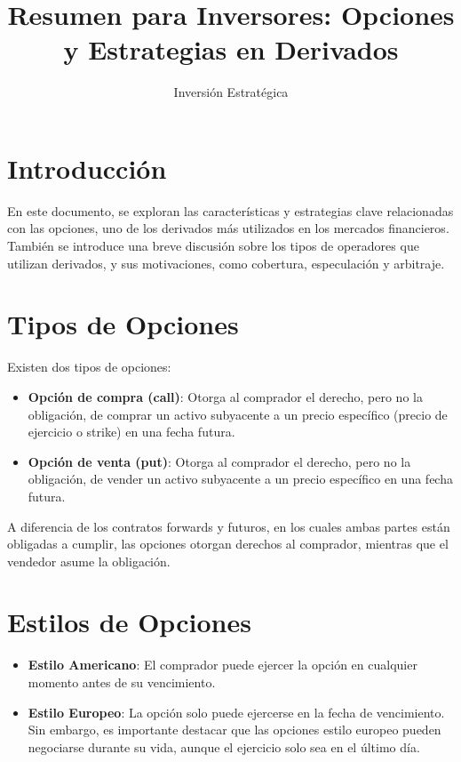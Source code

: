 \documentclass{article}
\title{Resumen para Inversores: Opciones y Estrategias en Derivados}
\author{Inversión Estratégica}
\begin{document}
\maketitle

\section*{Introducción}

En este documento, se exploran las características y estrategias clave relacionadas con las opciones, uno de los derivados más utilizados en los mercados financieros. También se introduce una breve discusión sobre los tipos de operadores que utilizan derivados, y sus motivaciones, como cobertura, especulación y arbitraje.

\section*{Tipos de Opciones}

Existen dos tipos de opciones:
\begin{itemize}
    \item \textbf{Opción de compra (call)}: Otorga al comprador el derecho, pero no la obligación, de comprar un activo subyacente a un precio específico (precio de ejercicio o strike) en una fecha futura.
    \item \textbf{Opción de venta (put)}: Otorga al comprador el derecho, pero no la obligación, de vender un activo subyacente a un precio específico en una fecha futura.
\end{itemize}

A diferencia de los contratos forwards y futuros, en los cuales ambas partes están obligadas a cumplir, las opciones otorgan derechos al comprador, mientras que el vendedor asume la obligación.

\section*{Estilos de Opciones}

\begin{itemize}
    \item \textbf{Estilo Americano}: El comprador puede ejercer la opción en cualquier momento antes de su vencimiento.
    \item \textbf{Estilo Europeo}: La opción solo puede ejercerse en la fecha de vencimiento. Sin embargo, es importante destacar que las opciones estilo europeo pueden negociarse durante su vida, aunque el ejercicio solo sea en el último día.
\end{itemize}
\end{document}
